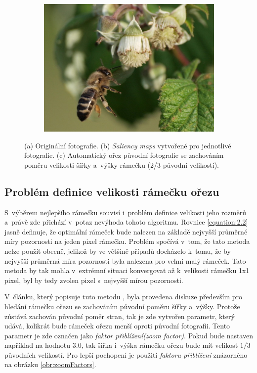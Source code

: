 \begin{figure}[H]
\begin{subfigure}{.32\textwidth}
      \includegraphics[scale=1.0]{obrazky/cropStentifordvcela.jpg}
      \caption{}
    \end{subfigure}
    \vspace{2pt}
    
\caption{(a) Originální fotografie. (b) \emph{Saliency maps} vytvořené pro jednotlivé fotografie. (c) Automatický ořez \cite{Stentiford2007} původní fotografie se zachováním poměru velikosti šířky a~výšky rámečku (2/3 původní velikosti).}
\label{obr:stentifordCrop}
\end{figure}

\subsection{Problém definice velikosti rámečku ořezu}
S~výběrem nejlepšího rámečku souvisí i~problém definice velikosti jeho rozměrů a~právě zde přichází v~potaz nevýhoda tohoto algoritmu. Rovnice \ref{equation:2.2} jasně definuje, že optimální rámeček bude nalezen na základě nejvyšší průměrné míry pozornosti na jeden pixel rámečku. Problém spočívá v~tom, že tato metoda nelze použít obecně, jelikož by ve většině případů docházelo k~tomu, že by nejvyšší průměrná míra pozornosti byla nalezena pro velmi malý rámeček. Tato metoda by tak mohla v~extrémní situaci konvergovat až k~velikosti rámečku 1x1 pixel, byl by tedy zvolen pixel s~nejvyšší mírou pozornosti.

V~článku, který popisuje tuto metodu \cite{Stentiford2007}, byla provedena diskuze především pro hledání rámečku ořezu se zachováním původní poměru šířky a~výšky. Protože zůstává zachován původní poměr stran, tak je zde vytvořen parametr, který udává, kolikrát bude rámeček ořezu menší oproti původní fotografii. Tento parametr je zde označen jako \emph{faktor přiblížení(zoom factor)}. Pokud bude nastaven například na hodnotu $3.0$, tak šířka i~výška rámečku ořezu bude mít velikost $1/3$ původních velikostí. Pro lepší pochopení je použití \emph{faktoru přiblížení} znázorněno na obrázku \ref{obr:zoomFactors}.



